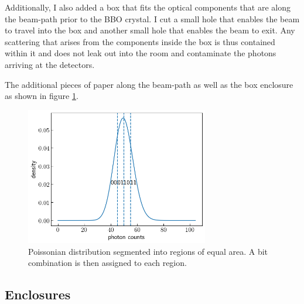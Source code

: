 \documentclass[letterpaper, 11 pt]{book}
\begin{document}
Additionally, I also added a box that fits the optical components that are along
the beam-path prior to the BBO crystal. I cut a small hole that enables the beam
to travel into the box and another small hole that enables the beam to exit. Any
scattering that arises from the components inside the box is thus contained
within it and does not leak out into the room and contaminate the photons
arriving at the detectors. 

The additional pieces of paper along the beam-path as well as the box enclosure
as shown in figure \ref{fig:paper_scatter}.
\begin{figure}[H]
    \centering
    \includegraphics[width = 8cm]{poisson_cut.png}
    \caption{Poissonian distribution segmented into regions of equal area. A bit combination is then assigned to each region.}
    \label{fig:paper_scatter}
\end{figure}

\subsection{Enclosures}
\end{document}
